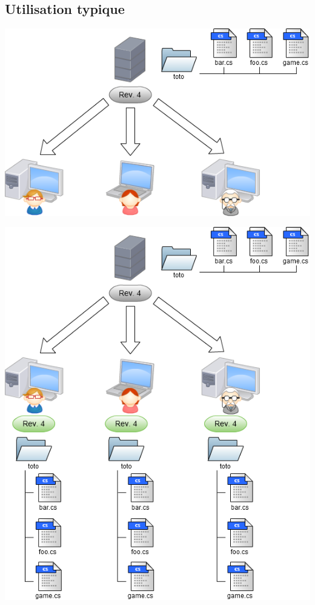 \subsection{Utilisation typique}

\begin{frame}
  \begin{center}
    \includegraphics[scale=0.52]{images/1-CheckOut.png}
  \end{center}
\end{frame}

\begin{frame}
  \begin{center}
    \includegraphics[scale=0.3]{images/2-CheckOut.png}
  \end{center}
\end{frame}

